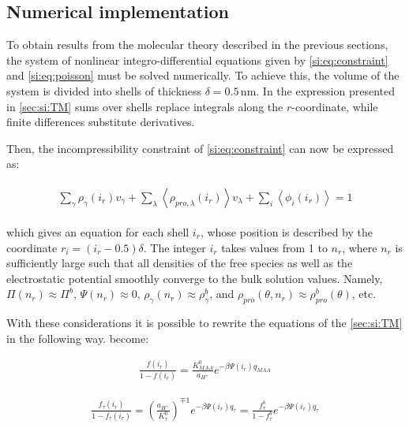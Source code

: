 \documentclass[journal=jacsat,manuscript=suppinfo]{achemso}
\begin{document}
\subsection{Numerical implementation}

To obtain results from the molecular theory described in the previous sections, the system of nonlinear integro-differential equations 
given by \cref{si:eq:constraint} and \cref{si:eq:poisson} must be 
solved numerically.
To achieve this, the volume of the system is divided into shells of thickness $\delta = 0.5\,$nm.
In the expression presented in \cref{sec:si:TM} sums over shells replace integrals along the $r$-coordinate, while finite differences substitute derivatives. 


Then, the incompressibility constraint of \cref{si:eq:constraint} can now be expressed as:


\begin{align}
	\begin{aligned}
		{\sum_{\gamma}\rho_\gamma(i_r) v_\gamma + \sum_\lambda{\left<\rho_{pro,\lambda}(i_r)\right>v_\lambda} + \sum_i{\left<\phi_i(i_r)\right>}} =1
		\label{si:eq:pi-ir}
	\end{aligned}
\end{align}

which gives an equation for each shell $i_r$, whose position is described by the coordinate $r_i = (i_r -0.5)\delta$. 
The integer $i_r$ takes values from 1 to $n_r$, where $n_r$ is sufficiently large such that all densities of the free species as well as the electrostatic potential smoothly converge to the bulk solution values.
Namely, 
$\Pi(n_r) \approx \Pi^b$,
$\Psi(n_r) \approx 0$,
$\rho_\gamma(n_r) \approx \rho_\gamma^b$, and $\rho_{pro}(\theta,n_r) \approx \rho_{pro}^b(\theta)$, etc.


With these considerations it is possible to rewrite the equations of the \cref{sec:si:TM} in the following  way.
 become:


\begin{align}
	\frac{f(i_r)}{1-f(i_r)}= \frac{K^0_{MAA}}{a_{H^+}}e^{-\beta \Psi(i_r) q_{MAA}}
\end{align}


\begin{align}
	\frac{f_\tau(i_r)}{1-f_\tau(i_r)}= \left(\frac{a_{H^+}}{K^0_{\tau}}\right)^{\mp 1} e^{-\beta \Psi(i_r) q_{\tau}} = \frac{f_\tau^b}{1-f_\tau^b}e^{-\beta \Psi(i_r) q_{\tau}}
\end{align}
\end{document}
